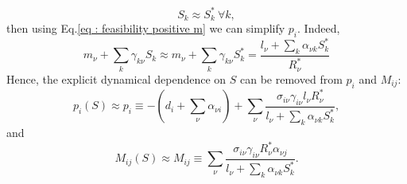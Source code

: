 \documentclass[12pt, titlepage, twoside, openright]{report}
\begin{document}
\begin{equation}
S_k \approx S^*_k \ \forall k,
\end{equation}
then using Eq.\eqref{eq : feasibility positive m} we can simplify $p_i$. Indeed,
\begin{equation}
m_\nu + \sum_k \gamma_{k\nu} S_k \approx m_\nu + \sum_k \gamma_{k\nu}S^*_k = \frac{l_\nu + \sum_k \alpha_{\nu k}S^*_k}{R^*_\nu} \label{eq: equality fluxes resource}
\end{equation}
Hence, the explicit dynamical dependence on $S$ can be removed from $p_i$ and $M_{ij}$:
\begin{equation}
p_i(S) \approx p_i \equiv - \left(d_i + \sum_\nu \alpha_{\nu i}\right) + \sum_\nu \frac{\sigma_{i\nu}\gamma_{i\nu}l_\nu R^*_\nu}{l_\nu + \sum_k \alpha_{\nu k}S^*_k},
\end{equation} and
\begin{equation}
M_{ij}(S) \approx M_{ij} \equiv \sum_\nu \frac{\sigma_{i\nu} \gamma_{i\nu} R^*_\nu \alpha_{\nu j}}{l_\nu + \sum_k{\alpha_{\nu k} S^*_k}}.
\end{equation}
\end{document}
